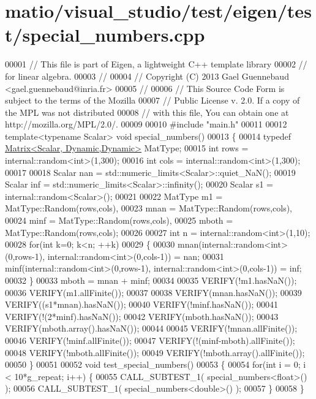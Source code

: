 \hypertarget{matio_2visual__studio_2test_2eigen_2test_2special__numbers_8cpp_source}{}\section{matio/visual\+\_\+studio/test/eigen/test/special\+\_\+numbers.cpp}
\label{matio_2visual__studio_2test_2eigen_2test_2special__numbers_8cpp_source}

\begin{DoxyCode}
00001 \textcolor{comment}{// This file is part of Eigen, a lightweight C++ template library}
00002 \textcolor{comment}{// for linear algebra.}
00003 \textcolor{comment}{//}
00004 \textcolor{comment}{// Copyright (C) 2013 Gael Guennebaud <gael.guennebaud@inria.fr>}
00005 \textcolor{comment}{//}
00006 \textcolor{comment}{// This Source Code Form is subject to the terms of the Mozilla}
00007 \textcolor{comment}{// Public License v. 2.0. If a copy of the MPL was not distributed}
00008 \textcolor{comment}{// with this file, You can obtain one at http://mozilla.org/MPL/2.0/.}
00009 
00010 \textcolor{preprocessor}{#include "main.h"}
00011 
00012 \textcolor{keyword}{template}<\textcolor{keyword}{typename} Scalar> \textcolor{keywordtype}{void} special\_numbers()
00013 \{
00014   \textcolor{keyword}{typedef} \hyperlink{group___core___module}{Matrix<Scalar, Dynamic,Dynamic>} MatType;
00015   \textcolor{keywordtype}{int} rows = internal::random<int>(1,300);
00016   \textcolor{keywordtype}{int} cols = internal::random<int>(1,300);
00017   
00018   Scalar nan = std::numeric\_limits<Scalar>::quiet\_NaN();
00019   Scalar inf = std::numeric\_limits<Scalar>::infinity();
00020   Scalar s1 = internal::random<Scalar>();
00021   
00022   MatType m1    = MatType::Random(rows,cols),
00023           mnan  = MatType::Random(rows,cols),
00024           minf  = MatType::Random(rows,cols),
00025           mboth = MatType::Random(rows,cols);
00026           
00027   \textcolor{keywordtype}{int} n = internal::random<int>(1,10);
00028   \textcolor{keywordflow}{for}(\textcolor{keywordtype}{int} k=0; k<n; ++k)
00029   \{
00030     mnan(internal::random<int>(0,rows-1), internal::random<int>(0,cols-1)) = nan;
00031     minf(internal::random<int>(0,rows-1), internal::random<int>(0,cols-1)) = inf;
00032   \}
00033   mboth = mnan + minf;
00034   
00035   VERIFY(!m1.hasNaN());
00036   VERIFY(m1.allFinite());
00037   
00038   VERIFY(mnan.hasNaN());
00039   VERIFY((s1*mnan).hasNaN());
00040   VERIFY(!minf.hasNaN());
00041   VERIFY(!(2*minf).hasNaN());
00042   VERIFY(mboth.hasNaN());
00043   VERIFY(mboth.array().hasNaN());
00044   
00045   VERIFY(!mnan.allFinite());
00046   VERIFY(!minf.allFinite());
00047   VERIFY(!(minf-mboth).allFinite());
00048   VERIFY(!mboth.allFinite());
00049   VERIFY(!mboth.array().allFinite());
00050 \}
00051 
00052 \textcolor{keywordtype}{void} test\_special\_numbers()
00053 \{
00054   \textcolor{keywordflow}{for}(\textcolor{keywordtype}{int} i = 0; i < 10*g\_repeat; i++) \{
00055     CALL\_SUBTEST\_1( special\_numbers<float>() );
00056     CALL\_SUBTEST\_1( special\_numbers<double>() );
00057   \}
00058 \}
\end{DoxyCode}
